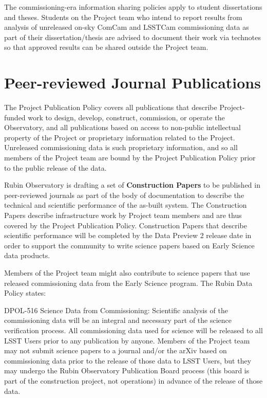 \documentclass[SE,authoryear,toc]{lsstdoc}
\begin{document}
The commissioning-era information sharing policies apply to student dissertations and theses.
Students on the Project team who intend to report results from analysis of unreleased on-sky ComCam and LSSTCam commissioning data as part of their dissertation/thesis are advised to document their work via technotes so that approved results can be shared outside the Project team.

\section{Peer-reviewed Journal Publications}
\label{publications}

The Project Publication Policy  covers all publications that describe Project-funded work to design, develop, construct, commission, or operate the Observatory, and all publications based on access to non-public intellectual property of the Project or proprietary information related to the Project.
Unreleased commissioning data is such proprietary information, and so all members of the Project team are bound by the Project Publication Policy prior to the public release of the data.

Rubin Observatory is drafting a set of \textbf{Construction Papers} to be published in peer-reviewed journals as part of the body of documentation to describe the technical and scientific performance of the as-built system.
The Construction Papers describe infrastructure work by Project team members and are thus covered by the Project Publication Policy.
Construction Papers that describe scientific performance will be completed by the Data Preview 2 release date in order to support the community to write science papers based on Early Science data products.

Members of the Project team might also contribute to science papers that use released commissioning data from the Early Science program.
The Rubin Data Policy  states:

\begin{emph}
  {DPOL-516 Science Data from Commissioning: Scientific analysis of the commissioning data will be an integral and necessary part of the science verification process.
  All commissioning data used for science will be released to all LSST Users prior to any publication by anyone.
  Members of the Project team may not submit science papers to a journal and/or the arXiv based on commissioning data prior to the release of those data to LSST Users, but they may undergo the Rubin Observatory Publication Board process (this board is part of the construction project, not operations) in advance of the release of those data.}
\end{emph}
\end{document}
